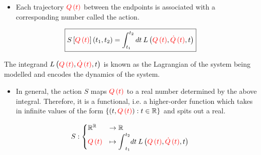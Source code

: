 \documentclass{beamer}
\begin{document}
\begin{frame}
\begin{itemize}
\item Each trajectory $\textcolor{red}{Q \left( t \right)}$ between the endpoints is associated with a corresponding number called the action.
\end{itemize}

$$\boxed{S \left[ \textcolor{red}{Q \left( t \right)} \right] \left( t_1, t_2 \right) = \int_{t_1}^{t_2} dt \: L \left( \textcolor{red}{Q \left( t \right)}, \textcolor{red}{\dot{Q} \left( t \right)}, t \right)}$$

\begin{flushright}
The integrand $L \left( \textcolor{red}{Q \left( t \right)}, \textcolor{red}{\dot{Q} \left( t \right)}, t \right)$ is known as the Lagrangian of the system being modelled and encodes the dynamics of the system.
\end{flushright}

\begin{itemize}
\item In general, the action $S$ maps $\textcolor{red}{Q \left( t \right)}$ to a real number determined by the above integral. Therefore, it is a functional, i.e. a higher-order function which takes in infinite values of the form $\left\{ \left( t, \textcolor{red}{Q \left( t \right)} \right) : t \in \mathbb{R} \right\}$ and spits out a real.
\end{itemize}

$$
S : \begin{cases} \mathbb{R}^\mathbb{R} & \to \mathbb{R} \\ \textcolor{red}{Q \left( t \right)} & \mapsto \displaystyle{\int}_{t_1}^{t_2} dt \: L \left( \textcolor{red}{Q \left( t \right)}, \textcolor{red}{\dot{Q} \left( t \right)}, t \right) \end{cases}
$$
\end{frame}
\end{document}
